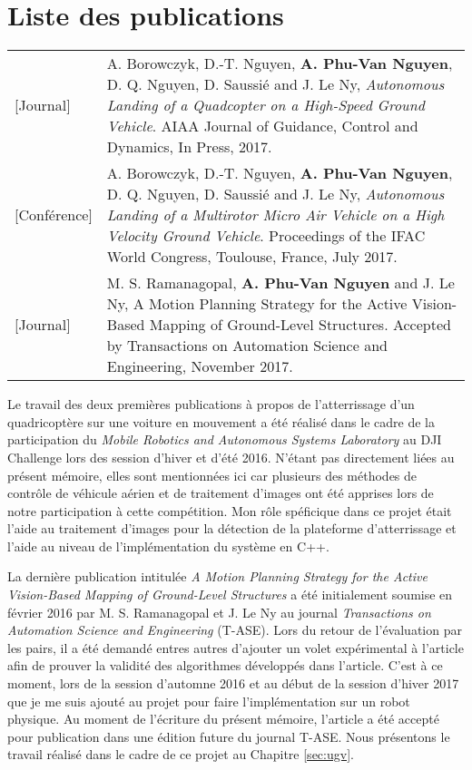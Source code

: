 \chapter*{Liste des publications}

\begin{longtable}{lp{5in}}
  [Journal]     & A. Borowczyk, D.-T. Nguyen, \textbf{A. Phu-Van Nguyen}, D. Q. Nguyen, D. Saussié and J. Le Ny, \textit{Autonomous Landing of a Quadcopter on a High-Speed Ground Vehicle}. AIAA Journal of Guidance, Control and Dynamics, In Press, 2017.\\

  [Conférence]  & A. Borowczyk, D.-T. Nguyen, \textbf{A. Phu-Van Nguyen}, D. Q. Nguyen, D. Saussié and J. Le Ny, \textit{Autonomous Landing of a Multirotor Micro Air Vehicle on a High Velocity Ground Vehicle}. Proceedings of the IFAC World Congress, Toulouse, France, July 2017.\\

  [Journal]      & M. S. Ramanagopal, \textbf{A. Phu-Van Nguyen} and J. Le Ny, A Motion Planning Strategy for the Active Vision-Based Mapping of Ground-Level Structures. Accepted by Transactions on Automation Science and Engineering, November 2017.
\end{longtable}

Le travail des deux premières publications à propos de l'atterrissage d'un quadricoptère sur une voiture en mouvement a été réalisé dans le cadre de la participation du \textit{Mobile Robotics and Autonomous Systems Laboratory} au DJI Challenge lors des session d'hiver et d'été 2016. N'étant pas directement liées au présent mémoire, elles sont mentionnées ici car plusieurs des méthodes de contrôle de véhicule aérien et de traitement d'images ont été apprises lors de notre participation à cette compétition. Mon rôle spéficique dans ce projet était l'aide au traitement d'images pour la détection de la plateforme d'atterrissage et l'aide au niveau de l'implémentation du système en C++.

La dernière publication intitulée \textit{A Motion Planning Strategy for the Active Vision-Based Mapping of Ground-Level Structures} a été initialement soumise en février 2016 par M. S. Ramanagopal et J. Le Ny au journal \textit{Transactions on Automation Science and Engineering} (T-ASE). Lors du retour de l'évaluation par les pairs, il a été demandé entres autres d'ajouter un volet expérimental à l'article afin de prouver la validité des algorithmes développés dans l'article. C'est à ce moment, lors de la session d'automne 2016 et au début de la session d'hiver 2017 que je me suis ajouté au projet pour faire l'implémentation sur un robot physique. Au moment de l'écriture du présent mémoire, l'article a été accepté pour publication dans une édition future du journal T-ASE. Nous présentons le travail réalisé dans le cadre de ce projet au Chapitre \ref{sec:ugv}.
